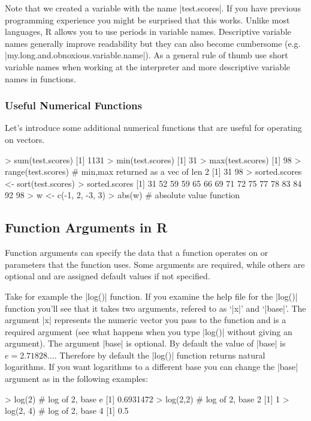 Note that we created a variable with the name |test.scores|.
If you have previous programming experience you might be surprised that
this works. Unlike most languages, R allows you to use periods in
variable names. Descriptive variable names generally improve readability
but they can also become cumbersome (e.g.
|my.long.and.obnoxious.variable.name|). As a general rule of
thumb use short variable names when working at the interpreter and more
descriptive variable names in functions.

\subsubsection{Useful Numerical Functions}

Let's introduce some additional numerical functions that are useful for
operating on vectors.
%
\begin{R}
> sum(test.scores)
[1] 1131
> min(test.scores)
[1] 31
> max(test.scores)
[1] 98
> range(test.scores) # min,max returned as a vec of len 2
[1] 31 98
> sorted.scores <- sort(test.scores)
> sorted.scores
 [1] 31 52 59 59 65 66 69 71 72 75 77 78 83 84 92 98
> w <- c(-1, 2, -3, 3)
> abs(w) # absolute value function
\end{R}


\subsection{Function Arguments in R}

Function arguments can specify the data that a function operates on or
parameters that the function uses. Some arguments are required, while
others are optional and are assigned default values if not specified.

Take for example the |log()| function. If you examine the help
file for the |log()| function you'll see that it takes two
arguments, refered to as `|x|' and `|base|'. The
argument |x| represents the numeric vector you pass to the
function and is a required argument (see what happens when you type
|log()| without giving an argument). The argument
|base| is optional. By default the value of |base|
is $e = 2.71828\ldots$. Therefore by default the |log()|
function returns natural logarithms. If you want logarithms to a
different base you can change the |base| argument as in the
following examples:
%
\begin{R}
> log(2) # log of 2, base e
[1] 0.6931472
> log(2,2) # log of 2, base 2
[1] 1
> log(2, 4) # log of 2, base 4
[1] 0.5
\end{R}



